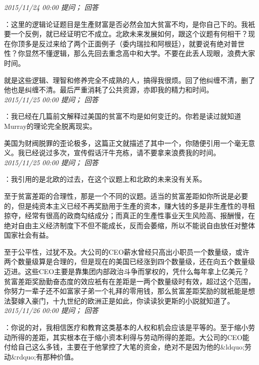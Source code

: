 \documentclass[twocolumn]{ctexart}
\begin{document}
\textit{\hfill\noindent\small 2015/11/24 00:00 提问； 回答}

：这里的逻辑论证题目是生產财富是否必然会加大贫富不均，是你自己下的。我衹要一个反例，就已经证明它不成立。北欧未来发展如何，跟这个议题有何相干？现在你顶多是反过来给了两个正面例子（委内瑞拉和阿根廷），就要说有绝对普世性？你显然不懂逻辑，那么先回去重念高中和大学。不要在此丢人现眼，浪费大家时间。

就是这些逻辑、理智和修养完全不成熟的人，搞得我很烦。回了他纠缠不清，删了他也是纠缠不清。最后严重消耗了公共资源，亦即我的精力和时间。\\

\textit{\hfill\noindent\small 2015/11/25 00:00 提问； 回答}

：我已经在几篇前文解释过美国的贫富不均是如何变迁的。你若是读过就知道Murray的理论完全脱离现实。

美国为财阀脱罪的歪论极多，这篇正文就描述了其中一个，你随便引用一个毫无意义。我已经说过多次，宣传假话汗牛充栋，请不要拿来浪费我的时间。\\

\textit{\hfill\noindent\small 2015/11/25 00:00 提问； 回答}

：我引用的是北欧的过去，在这个议题上和北欧的未来没有关系。

至于贫富差距的合理性，那是一个不同的议题。适当的贫富差距如你所说是必要的，但是纯资本主义已经不再奖励用于生產的资本，赚大钱的多是非生產性的寻租掠夺，经常有很高的政商勾结成分；而真正的生產性事业天生风险高、报酬慢，在绝对自由主义经济制度下不但不能成长，反而会萎缩，所以不能说自由放任对整体国家社会有益。

至于公平性，过犹不及。大公司的CEO薪水曾经只高出小职员一个数量级，或许两个数量级算是合理的，但是现在的美国已经涨到四个数量级，还在向五个数量级迈进。这些CEO主要是靠集团内部政治斗争而掌权的，凭什么每年拿上亿美元？贫富差距奖励勤奋态度的效应衹有在差距是一两个数量级时有效，超过这个范围，你努力一辈子还不如富家子弟一个礼拜的零用钱，那么贫富差距奖励的就衹能是想法娶嫁入豪门，十九世纪的欧洲正是如此，你读读狄更斯的小説就知道了。\\

\textit{\hfill\noindent\small 2015/11/26 00:00 提问； 回答}

：你说的对，我相信医疗和教育这类基本的人权和机会应该是平等的。至于缩小劳动所得的差距，其实根本在于缩小资本利得与劳动所得的差距。大公司的CEO能付给自己这么多钱，主要在于他掌控了大笔的资金，绝对不是因为他的\&ldquo;劳动\&rdquo;有那种价值。\\
\end{document}
